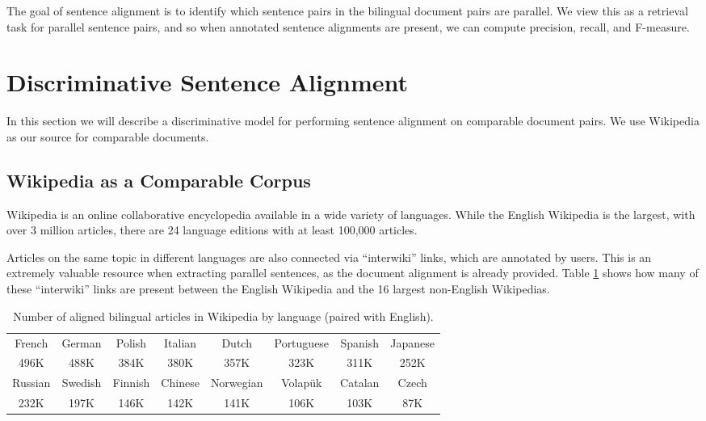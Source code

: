 \documentclass[11pt,letterpaper]{article}
\begin{document}
The goal of sentence alignment is to identify which sentence pairs in the
bilingual document pairs are parallel. We view this as a retrieval task for
parallel sentence pairs, and so when annotated sentence alignments are present,
we can compute precision, recall, and F-measure.

\section{Discriminative Sentence Alignment}
\label{sec:disc}
In this section we will describe a discriminative model for performing sentence
alignment on comparable document pairs.
We use Wikipedia as our source for
comparable documents.

\subsection{Wikipedia as a Comparable Corpus}
\label{sec:wiki}
Wikipedia \cite{wikipedia} is an online collaborative encyclopedia available in
a wide variety of languages.  While the English Wikipedia is the largest, with
over 3 million articles, there are 24 language editions with at least 100,000
articles.

Articles on the same topic in different languages are also connected via
``interwiki'' links, which are annotated by users.  This is an extremely
valuable resource when extracting parallel sentences, as the document alignment
is already provided.  
Table \ref{table:interwiki} shows how
many of these ``interwiki'' links are present between the English Wikipedia and the
16 largest non-English Wikipedias.

\begin{table}
\begin{center}
\begin{tabular}{|c|c|c|c|c|c|c|c|}
\hline
French & German & Polish & Italian & Dutch & Portuguese & Spanish & Japanese \\
496K & 488K & 384K & 380K & 357K & 323K & 311K & 252K\\
\hline
Russian & Swedish & Finnish & Chinese & Norwegian & Volap\"{u}k & Catalan & Czech \\
232K & 197K & 146K & 142K & 141K & 106K & 103K & 87K\\
\hline
\end{tabular}
\end{center}
\caption{Number of aligned bilingual articles in Wikipedia by language (paired with English).}
\label{table:interwiki}
\end{table}
\end{document}
